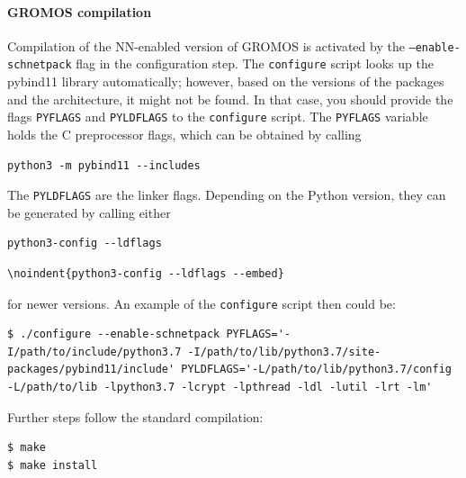 \paragraph{GROMOS compilation}
Compilation of the NN-enabled version of GROMOS is activated by the \texttt{--enable-schnetpack} flag in the configuration step. The \texttt{configure} script looks up the pybind11 library automatically; however, based on the versions of the packages and the architecture, it might not be found. In that case, you should provide the flags \texttt{PYFLAGS} and \texttt{PYLDFLAGS} to the \texttt{configure} script. The \texttt{PYFLAGS} variable holds the C preprocessor flags, which can be obtained by calling

\begin{lstlisting}[breaklines=true, breakatwhitespace=false]
python3 -m pybind11 --includes
\end{lstlisting}

The \texttt{PYLDFLAGS} are the linker flags. Depending on the Python version, they can be generated by calling either 

\begin{lstlisting}[breaklines=true, breakatwhitespace=false]
python3-config --ldflags
\end{lstlisting}


\begin{lstlisting}[breaklines=true, breakatwhitespace=false]
\noindent{python3-config --ldflags --embed}
\end{lstlisting}

for newer versions. An example of the \texttt{configure} script then could be:
\begin{lstlisting}[breaklines=true, breakatwhitespace=false, showstringspaces=false]
$ ./configure --enable-schnetpack PYFLAGS='-I/path/to/include/python3.7 -I/path/to/lib/python3.7/site-packages/pybind11/include' PYLDFLAGS='-L/path/to/lib/python3.7/config -L/path/to/lib -lpython3.7 -lcrypt -lpthread -ldl -lutil -lrt -lm'
\end{lstlisting}

Further steps follow the standard compilation:
\begin{lstlisting}[breaklines=true, breakatwhitespace=false]
$ make
$ make install
\end{lstlisting}


